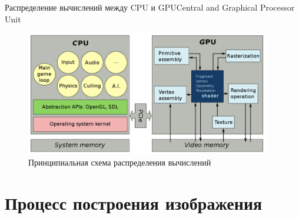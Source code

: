 \documentclass{beamer}
\begin{document}
\begin{frame}{Распределение вычислений между CPU и GPU}{Central and Graphical Processor Unit}
	\begin{figure}
		\includegraphics[width=0.95\textwidth]{images/Calculation_distribution_scheme.png}
		\caption {Принципиальная схема распределения вычислений}
	\end{figure}


\end{frame}

\section{Процесс построения изображения}
\end{document}
